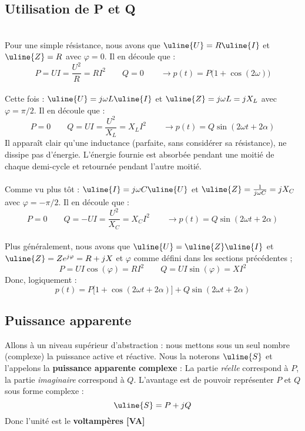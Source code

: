\documentclass[12pt,a4paper]{article}
\newcommand{\uz}{\uline{Z} }
\newcommand{\ui}{\uline{I} }
\newcommand{\uu}{\uline{U} }
\newcommand{\us}{\uline{S} }
\begin{document}
\subsection{Utilisation de P et Q}
\\
Pour une simple résistance, nous avons que $\uu = R\ui$ et $\uz = R$ avec $\varphi = 0$. Il en découle que :
\[P = UI = \frac{U^2}{R} = RI^2 \qquad Q = 0 \qquad \to p(t) =  P\big(1+ \cos(2\omega)\big)\]
\\
Cette fois : $\uu = j\omega L \ui$ et $\uz = j\omega L = j X_L$ avec $\varphi = \pi/2$. Il en découle que :
\[P = 0 \qquad Q = UI = \frac{U^2}{X_L} = X_L I^2 \qquad \to p(t) = Q \sin(2\omega t + 2 \alpha)\]
Il apparaît clair qu'une inductance (parfaite, sans considérer sa résistance), ne dissipe pas d'énergie. L'énergie fournie est absorbée pendant une moitié de chaque demi-cycle et retournée pendant l'autre moitié.\\
\\
Comme vu plus tôt : $\ui = j\omega C \uu$ et $\uz = \frac{1}{j\omega C} = jX_C$ avec $\varphi = -\pi/2$. Il en découle que :
\[P = 0 \qquad Q = -UI = \frac{U^2}{X_C} = X_C I^2 \qquad \to 	p(t) = Q\sin(2\omega t + 2\alpha)\]
\\
Plus généralement, nous avons que $\uu = \uz \ui$ et $\uz = Ze^{j\varphi} = R + jX$ et $\varphi$ comme défini dans les sections précédentes ;
\[P = UI\cos(\varphi) = RI^2 \qquad Q = UI \sin(\varphi) = XI^2\]
Donc, logiquement :
\[p(t) = P\big[1 + \cos(2\omega t + 2\alpha)\big] + Q \sin(2\omega t + 2\alpha)\]
\subsection{Puissance apparente}
Allons à un niveau supérieur d'abstraction : nous mettons sous un seul nombre (complexe) la puissance active et réactive. Nous la noterons $\us$ et l'appelons la \textbf{puissance apparente complexe} : La partie \textit{réelle} correspond à $P$, la partie \textit{imaginaire} correspond à $Q$. L'avantage est de pouvoir représenter $P$ et $Q$ sous forme complexe :
\begin{equation}
	\us = P + jQ
\end{equation}
Donc l'unité est le \textbf{voltampères [VA]}
\end{document}
